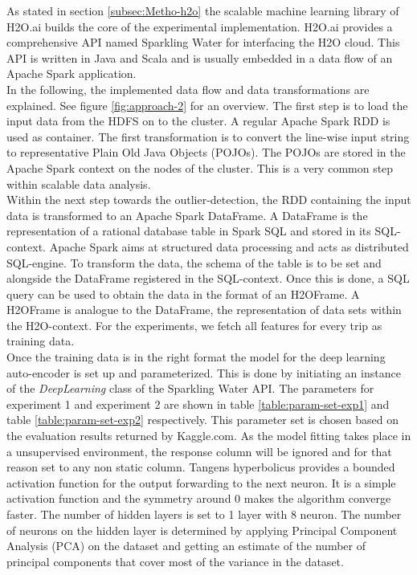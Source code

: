 \documentclass{vldb}
\begin{document}
As stated in section \ref{subsec:Metho-h2o} the scalable machine learning library of H2O.ai builds the core of the experimental implementation. H2O.ai provides a comprehensive API named Sparkling Water for interfacing the H2O cloud. This API is written in Java and Scala and is usually embedded in a data flow of an Apache Spark application. \\
In the following, the implemented data flow and data transformations are explained. See figure \ref{fig:approach-2} for an overview. The first step is to load the input data from the HDFS on to the cluster. A regular Apache Spark RDD is used as container. The first transformation is to convert the line-wise input string to representative Plain Old Java Objects (POJOs). The POJOs are stored in the Apache Spark context on the nodes of the cluster. This is a very common step within scalable data analysis.\\
Within the next step towards the outlier-detection, the RDD containing the input data is transformed to an Apache Spark DataFrame. A DataFrame is the representation of a rational database table in Spark SQL and stored in its SQL-context. Apache Spark aims at structured data processing and acts as distributed SQL-engine. To transform the data, the schema of the table is to be set and alongside the DataFrame registered in the SQL-context. Once this is done, a SQL query can be used to obtain the data in the format of an H2OFrame. A H2OFrame is analogue to the DataFrame, the representation of data sets within the H2O-context. For the experiments, we fetch all features for every trip as training data.\\
Once the training data is in the right format the model for the deep learning auto-encoder is set up and parameterized. This is done by initiating an instance of the \textit{DeepLearning} class of the Sparkling Water API. The parameters for experiment 1 and experiment 2 are shown in table \ref{table:param-set-exp1} and table \ref{table:param-set-exp2} respectively. This parameter set is chosen based on the evaluation results returned by Kaggle.com. As the model fitting takes place in a unsupervised environment, the response column will be ignored and for that reason set to any non static column. Tangens hyperbolicus provides a bounded activation function for the output forwarding to the next neuron. It is a simple activation function and the symmetry around 0 makes the algorithm converge faster. The number of hidden layers is set to 1 layer with 8 neuron. The number of neurons on the hidden layer is determined by applying Principal Component Analysis (PCA) on the dataset and getting an estimate of the number of principal components that cover most of the variance in the dataset.
\end{document}
